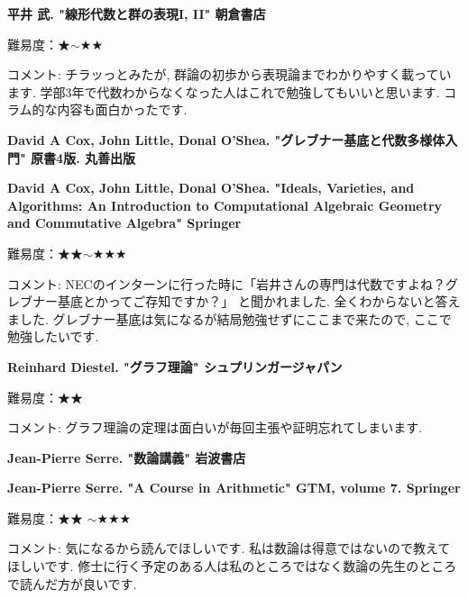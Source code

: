 \textbf{平井 武. "線形代数と群の表現I, II" 朝倉書店}  　\vspace{-6pt} 


難易度：★$\sim$★★ 　 　\vspace{-6pt} 

コメント: チラッっとみたが, 群論の初歩から表現論までわかりやすく載っています. 学部3年で代数わからなくなった人はこれで勉強してもいいと思います. コラム的な内容も面白かったです. 

\vspace{8pt}




\textbf{David A Cox, John Little, Donal O'Shea. "グレブナー基底と代数多様体入門" 原書4版. 丸善出版}  　\vspace{-6pt} 

\textbf{David A Cox, John Little, Donal O'Shea. "Ideals, Varieties, and Algorithms: An Introduction to Computational Algebraic Geometry and Commutative Algebra" Springer}  　\vspace{-6pt} 

難易度：★★$\sim$★★★\vspace{-6pt} 

コメント: NECのインターンに行った時に「岩井さんの専門は代数ですよね？グレブナー基底とかってご存知ですか？」
と聞かれました. 全くわからないと答えました. 
グレブナー基底は気になるが結局勉強せずにここまで来たので, ここで勉強したいです. 
\vspace{8pt}

\textbf{Reinhard Diestel. "グラフ理論" シュプリンガージャパン}  　\vspace{-6pt} 

難易度：★★\vspace{-6pt} 

コメント: グラフ理論の定理は面白いが毎回主張や証明忘れてしまいます. 
\vspace{8pt}

\textbf{Jean-Pierre Serre. "数論講義" 岩波書店}  　\vspace{-6pt} 

\textbf{Jean-Pierre Serre. "A Course in Arithmetic" GTM, volume 7. Springer}  　\vspace{-6pt} 

難易度：★★ $\sim$★★★\vspace{-6pt} 

コメント: 気になるから読んでほしいです. 私は数論は得意ではないので教えてほしいです. 
修士に行く予定のある人は私のところではなく数論の先生のところで読んだ方が良いです. 
\vspace{8pt}

